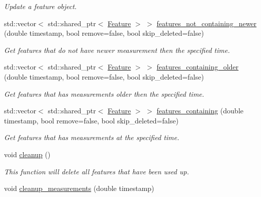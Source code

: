 \begin{DoxyCompactItemize}
\begin{DoxyCompactList}\small\item\em Update a feature object. \end{DoxyCompactList}\item 
std\+::vector$<$ std\+::shared\+\_\+ptr$<$ \hyperlink{classov__core_1_1Feature}{Feature} $>$ $>$ \hyperlink{classov__core_1_1FeatureDatabase_a4f6d8da846e81eac1faa3c7abd7f44a7}{features\+\_\+not\+\_\+containing\+\_\+newer} (double timestamp, bool remove=false, bool skip\+\_\+deleted=false)
\begin{DoxyCompactList}\small\item\em Get features that do not have newer measurement then the specified time. \end{DoxyCompactList}\item 
std\+::vector$<$ std\+::shared\+\_\+ptr$<$ \hyperlink{classov__core_1_1Feature}{Feature} $>$ $>$ \hyperlink{classov__core_1_1FeatureDatabase_a5cdb62171c42c8787daec984a8cebe15}{features\+\_\+containing\+\_\+older} (double timestamp, bool remove=false, bool skip\+\_\+deleted=false)
\begin{DoxyCompactList}\small\item\em Get features that has measurements older then the specified time. \end{DoxyCompactList}\item 
std\+::vector$<$ std\+::shared\+\_\+ptr$<$ \hyperlink{classov__core_1_1Feature}{Feature} $>$ $>$ \hyperlink{classov__core_1_1FeatureDatabase_a144b59272688f0aeea0ecec6028dca04}{features\+\_\+containing} (double timestamp, bool remove=false, bool skip\+\_\+deleted=false)
\begin{DoxyCompactList}\small\item\em Get features that has measurements at the specified time. \end{DoxyCompactList}\item 
void \hyperlink{classov__core_1_1FeatureDatabase_abee9d8a5fa7fc4a97911058b6e8d10a0}{cleanup} ()
\begin{DoxyCompactList}\small\item\em This function will delete all features that have been used up. \end{DoxyCompactList}\item 
\mbox{\label{classov__core_1_1FeatureDatabase_a690e2279ff954a380036f6e69445fa16}} 
void \hyperlink{classov__core_1_1FeatureDatabase_a690e2279ff954a380036f6e69445fa16}{cleanup\+\_\+measurements} (double timestamp)

\end{DoxyCompactItemize}
